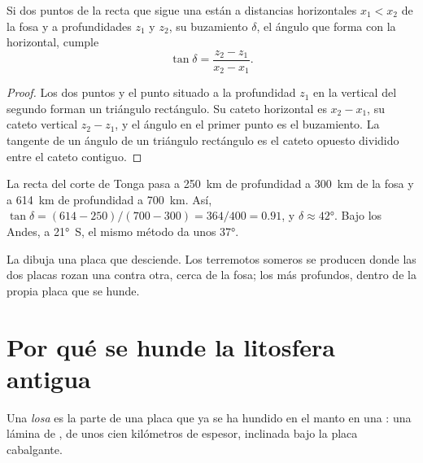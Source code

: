 \begin{proposition}\label{prop:g11:subduction-zones:dip}
Si dos puntos de la recta que sigue una  están a
distancias horizontales $x_1 < x_2$ de la fosa y a profundidades $z_1$ y
$z_2$, su buzamiento $\delta$, el ángulo que forma con la horizontal, cumple
\[
  \tan \delta = \frac{z_2 - z_1}{x_2 - x_1}.
\]
\end{proposition}

\begin{proof}
Los dos puntos y el punto situado a la profundidad $z_1$ en la vertical del
segundo forman un triángulo rectángulo. Su cateto horizontal es $x_2 - x_1$,
su cateto vertical $z_2 - z_1$, y el ángulo en el primer punto es el
buzamiento. La tangente de un ángulo de un triángulo rectángulo es el cateto
opuesto dividido entre el cateto contiguo.
\end{proof}

\begin{example}\label{ex:g11:subduction-zones:dip}
La recta del corte de Tonga pasa a \qty{250}{km} de profundidad a
\qty{300}{km} de la fosa y a \qty{614}{km} de profundidad a \qty{700}{km}. Así,
$\tan\delta = (614 - 250)/(700 - 300) = 364/400 = 0.91$, y
$\delta \approx \ang{42}$. Bajo los Andes, a \ang{21}~S, el mismo
método da unos \ang{37}.
\end{example}

La  dibuja una placa que desciende. Los terremotos
someros se producen donde las dos placas rozan una contra otra, cerca de la
fosa; los más profundos, dentro de la propia placa que se hunde.

\section{Por qué se hunde la litosfera antigua}

\begin{definition}[Losa]\label{def:g11:subduction-zones:slab}
Una \emph{losa} es la parte de una placa que ya se ha hundido en
el manto en una : una lámina de , de unos
cien kilómetros de espesor, inclinada bajo la placa cabalgante.
\end{definition}

